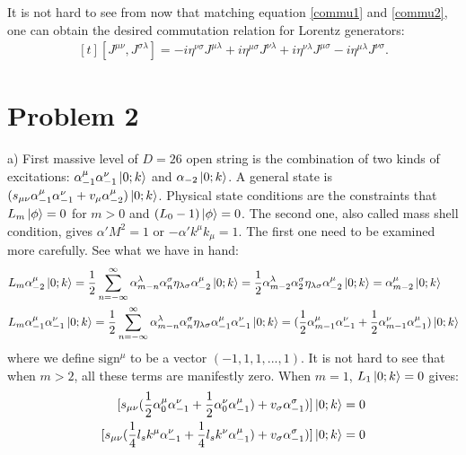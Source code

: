 \documentclass[12pt]{article}
\begin{document}
It is not hard to see from now that matching equation \ref{commu1} and \ref{commu2}, one can obtain the desired commutation relation for Lorentz generators:
\begin{equation}
\begin{aligned}[t]
[J^{\mu\nu}, J^{\sigma\lambda}]=-i\eta^{\nu\sigma}J^{\mu\lambda}+i\eta^{\mu\sigma}J^{\nu\lambda}+i\eta^{\nu\lambda}J^{\mu\sigma}-i\eta^{\mu\lambda}J^{\nu\sigma}.
\end{aligned}
\end{equation}
\section{Problem 2}
\begin{paragraph}{a)}
First massive level of $D=26$ open string is the combination of two kinds of excitations: $\alpha_{-1}^\mu\alpha_{-1}^\nu\ket{0;k}$ and $\alpha_{-2}\ket{0;k}$. A general state is $(s_{\mu\nu}\alpha_{-1}^\mu\alpha_{-1}^\nu+v_\mu\alpha_{-2}^\mu)\ket{0;k}$. Physical state conditions are the constraints that $L_m\ket{\phi}=0$ for $m>0$ and $(L_0-1)\ket{\phi}=0$.  The second one, also called mass shell condition, gives $\alpha' M^2=1$ or $-\alpha' k^\mu k_\mu=1$. The first one need to be examined more carefully. See what we have in hand:
\begin{equation}
\begin{aligned}[t]
&L_m \alpha_{-2}^\mu \ket{0;k}=\frac{1}{2}\sum\limits_{n=-\infty}^{\infty}\alpha_{m-n}^\lambda\alpha_n^\sigma \eta_{\lambda\sigma} \alpha_{-2}^\mu\ket{0;k} =\frac{1}{2} \alpha_{m-2}^\lambda \alpha_2^\sigma\eta_{\lambda\sigma} \alpha_{-2}^\mu \ket{0;k}=\alpha_{m-2}^\mu \ket{0;k}\\
&L_m\alpha_{-1}^\mu\alpha_{-1}^\nu\ket{0;k}=\frac{1}{2}\sum\limits_{n=-\infty}^\infty\alpha_{m-n}^\lambda\alpha_n^\sigma \eta_{\lambda\sigma}\alpha_{-1}^\mu\alpha_{-1}^\nu\ket{0;k}=(\frac{1}{2}\alpha_{m-1}^\mu\alpha_{-1}^\nu+\frac{1}{2}\alpha_{m-1}^\nu\alpha_{-1}^\mu)\ket{0;k}
\end{aligned}
\end{equation}
where we define $\text{sign}^\mu$ to be a vector $(-1,1,1,...,1)$. It is not hard to see that when $m>2$, all these terms are manifestly zero. When $m=1$, $L_1\ket{0;k}=0$ gives:
\begin{equation}
\begin{aligned}[t]
[s_{\mu\nu}(\frac{1}{2}\alpha_{0}^\mu\alpha_{-1}^\nu+\frac{1}{2}\alpha_{0}^\nu\alpha_{-1}^\mu)+v_\sigma \alpha_{-1}^\sigma)]\ket{0;k}=0\\
[s_{\mu\nu}(\frac{1}{4}l_s k^\mu\alpha_{-1}^\nu+\frac{1}{4}l_s k^\nu\alpha_{-1}^\mu)+v_\sigma \alpha_{-1}^\sigma)]\ket{0;k}=0\\
\end{aligned}
\end{equation}
\end{paragraph}
\end{document}
